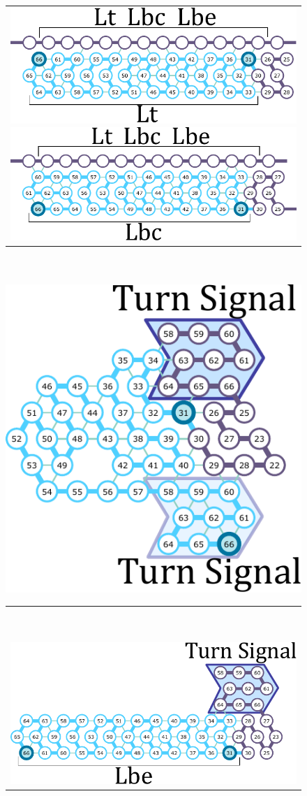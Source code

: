\documentclass[runningheads]{llncs}
\begin{document}
\begin{figure}[tb]
\begin{tabular}{c}
 \begin{minipage}{0.5\linewidth}
  \centering
   \includegraphics[width=0.8\linewidth]{fig/svg/Lt_1.pdf}
 \end{minipage}
 
 \begin{minipage}{0.5\linewidth}
  \centering
   \includegraphics[width=0.8\linewidth]{fig/svg/Lbc_1.pdf}

 \end{minipage}
 \end{tabular}

\ \\
\ \\
  \centering
   \includegraphics[width=0.4\linewidth]{fig/svg/Ltrc_1.pdf}


\begin{tabular}{c}
\ \\
\ \\
 \begin{minipage}{0.5\linewidth}
  \centering
   \includegraphics[width=0.9\linewidth]{fig/svg/Lbe_1.pdf}
 \end{minipage}
 

\end{tabular}
\end{figure}
\end{document}
